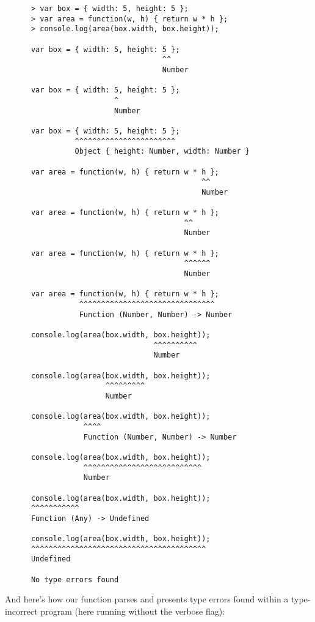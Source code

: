 \documentclass[british, twoside]{bhamthesis}
\theoremstyle{definition}
\begin{document}
      \begin{lstlisting}
      > var box = { width: 5, height: 5 };
      > var area = function(w, h) { return w * h };
      > console.log(area(box.width, box.height));

      var box = { width: 5, height: 5 };
                                    ^^
                                    Number

      var box = { width: 5, height: 5 };
                         ^
                         Number

      var box = { width: 5, height: 5 };
                ^^^^^^^^^^^^^^^^^^^^^^^
                Object { height: Number, width: Number }

      var area = function(w, h) { return w * h };
                                             ^^
                                             Number

      var area = function(w, h) { return w * h };
                                         ^^
                                         Number

      var area = function(w, h) { return w * h };
                                         ^^^^^^
                                         Number

      var area = function(w, h) { return w * h };
                 ^^^^^^^^^^^^^^^^^^^^^^^^^^^^^^^
                 Function (Number, Number) -> Number

      console.log(area(box.width, box.height));
                                  ^^^^^^^^^^
                                  Number

      console.log(area(box.width, box.height));
                       ^^^^^^^^^
                       Number

      console.log(area(box.width, box.height));
                  ^^^^
                  Function (Number, Number) -> Number

      console.log(area(box.width, box.height));
                  ^^^^^^^^^^^^^^^^^^^^^^^^^^^
                  Number

      console.log(area(box.width, box.height));
      ^^^^^^^^^^^
      Function (Any) -> Undefined

      console.log(area(box.width, box.height));
      ^^^^^^^^^^^^^^^^^^^^^^^^^^^^^^^^^^^^^^^^
      Undefined

      No type errors found
      \end{lstlisting}

      And here's how our function parses and presents type errors found within a type-incorrect program (here running without the verbose flag):
\end{document}
